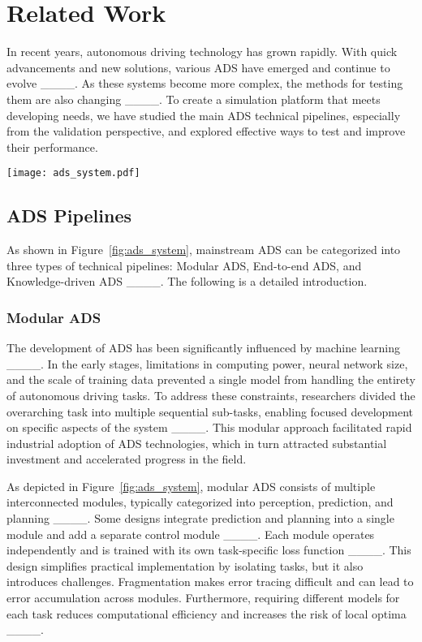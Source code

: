 \section{Related Work}
\label{section:ads}

In recent years, autonomous driving technology has grown rapidly. With quick advancements and new solutions, various ADS have emerged and continue to evolve ____. As these systems become more complex, the methods for testing them are also changing ____. To create a simulation platform that meets developing needs, we have studied the main ADS technical pipelines, especially from the validation perspective, and explored effective ways to test and improve their performance.

\begin{figure*}
    \centering
    \texttt{[image: ads\_system.pdf]}
    \caption{\textrm{Multiple technology pipelines for autonomous driving systems.}}
    \label{fig:ads_system}
\end{figure*}

\subsection{ADS Pipelines}

As shown in Figure~\ref{fig:ads_system}, mainstream ADS  can be categorized into three types of technical pipelines: Modular ADS, End-to-end ADS, and Knowledge-driven ADS ____. The following is a detailed introduction.

\subsubsection{Modular ADS}


The development of ADS has been significantly influenced by machine learning ____. In the early stages, limitations in computing power, neural network size, and the scale of training data prevented a single model from handling the entirety of autonomous driving tasks. To address these constraints, researchers divided the overarching task into multiple sequential sub-tasks, enabling focused development on specific aspects of the system ____. This modular approach facilitated rapid industrial adoption of ADS technologies, which in turn attracted substantial investment and accelerated progress in the field.

As depicted in Figure~\ref{fig:ads_system}, modular ADS consists of multiple interconnected modules, typically categorized into perception, prediction, and planning ____. Some designs integrate prediction and planning into a single module and add a separate control module ____. Each module operates independently and is trained with its own task-specific loss function ____. This design simplifies practical implementation by isolating tasks, but it also introduces challenges. Fragmentation makes error tracing difficult and can lead to error accumulation across modules. Furthermore, requiring different models for each task reduces computational efficiency and increases the risk of local optima ____.

